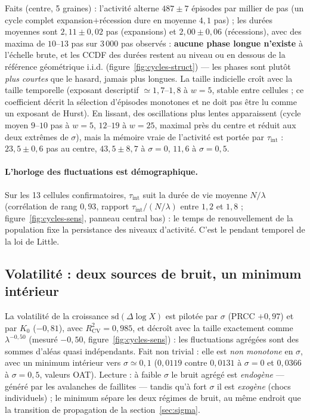 \documentclass[11pt,a4paper]{article}
\begin{document}
Faits (centre, 5 graines) : l'activité alterne $487\pm7$ épisodes par
millier de pas (un cycle complet expansion$+$récession dure en moyenne
$4{,}1$ pas) ; les durées moyennes sont $2{,}11\pm0{,}02$ pas
(expansions) et $2{,}00\pm0{,}06$ (récessions), avec des maxima de
$10$--$13$ pas sur 3\,000 pas observés : \textbf{aucune phase longue
n'existe} à l'échelle brute, et les CCDF des durées restent au niveau
ou en dessous de la référence géométrique i.i.d.
(figure~\ref{fig:cycles-struct}) — les phases sont plutôt \emph{plus
courtes} que le hasard, jamais plus longues. La taille indicielle croît
avec la taille temporelle (exposant descriptif
$\simeq1{,}7$--$1{,}8$ à $w=5$, stable entre cellules ; ce coefficient
décrit la sélection d'épisodes monotones et ne doit pas être lu comme
un exposant de Hurst). En lissant, des oscillations plus lentes
apparaissent (cycle moyen $9$--$10$ pas à $w=5$, $12$--$19$ à $w=25$,
maximal près du centre et réduit aux deux extrêmes de $\sigma$), mais
la mémoire vraie de l'activité est portée par
$\tau_{\mathrm{int}}$ : $23{,}5\pm0{,}6$ pas au centre,
$43{,}5\pm8{,}7$ à $\sigma=0$, $11{,}6$ à $\sigma=0{,}5$.

\paragraph{L'horloge des fluctuations est démographique.} Sur les 13
cellules confirmatoires, $\tau_{\mathrm{int}}$ suit la durée de vie
moyenne $N/\lambda$ (corrélation de rang $0{,}93$, rapport
$\tau_{\mathrm{int}}/(N/\lambda)$ entre $1{,}2$ et $1{,}8$ ;
figure~\ref{fig:cycles-sens}, panneau central bas) : le temps de
renouvellement de la population fixe la persistance des niveaux
d'activité. C'est le pendant temporel de la loi de Little.

\subsection{Volatilité : deux sources de bruit, un minimum intérieur}

La volatilité de la croissance $\mathrm{sd}(\Delta\log X)$ est pilotée
par $\sigma$ (PRCC $+0{,}97$) et par $K_0$ ($-0{,}81$), avec
$R^2_{\mathrm{CV}}=0{,}985$, et décroît avec la taille exactement comme
$\lambda^{-0{,}50}$ (mesuré $-0{,}50$, figure~\ref{fig:cycles-sens}) :
les fluctuations agrégées sont des sommes d'aléas quasi indépendants.
Fait non trivial : elle est \emph{non monotone} en $\sigma$, avec un
minimum intérieur vers $\sigma\simeq0{,}1$ ($0{,}0119$ contre
$0{,}0131$ à $\sigma=0$ et $0{,}0366$ à $\sigma=0{,}5$, valeurs OAT).
Lecture : à faible $\sigma$ le bruit agrégé est \emph{endogène} —
généré par les avalanches de faillites — tandis qu'à fort $\sigma$ il
est \emph{exogène} (chocs individuels) ; le minimum sépare les deux
régimes de bruit, au même endroit que la transition de propagation de
la section~\ref{sec:sigma}.
\end{document}
